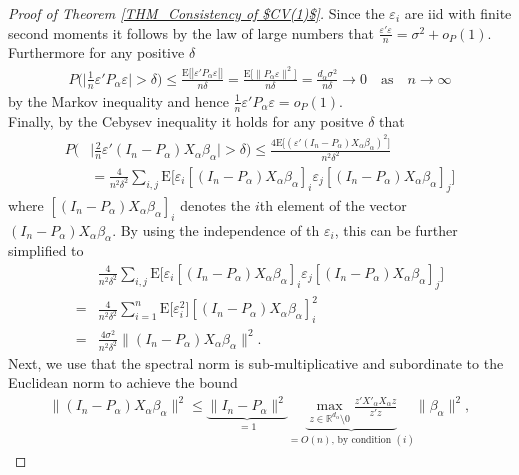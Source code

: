\documentclass[Research_Module_ES.tex]{subfiles}
\begin{document}
\begin{proof}[Proof of Theorem \ref{THM_Consistency of $CV(1)$}]
	Since the $\varepsilon_i$ are iid with finite second moments it follows by the law of large numbers that
	$\frac{\varepsilon'\varepsilon}{n} = \sigma^2 + o_P(1)$.
	Furthermore for any positive $\delta$
	\begin{align*}
	P\biggl(\biggl|\frac{1}{n}\varepsilon'P_\alpha\varepsilon\biggr|>\delta\biggr) \le \frac{\mathrm{E}\bigl[|\varepsilon'P_\alpha\varepsilon|\bigr]}{n\delta}=\frac{\mathrm{E}\bigl[\lVert P_\alpha\varepsilon\rVert^2\bigr]}{n\delta}=\frac{d_\alpha \sigma^2}{n\delta} \to 0 \quad \textrm{as} \quad n\to \infty
	\end{align*}
	by the Markov inequality and hence $\frac{1}{n}\varepsilon'P_\alpha\varepsilon = o_P(1)$.\\
	Finally, by the Cebysev inequality it holds for any positve $\delta$ that
	\begin{align*}
	P\biggl(&\biggl|\frac{2}{n}\varepsilon'(I_n-P_\alpha)X_\alpha\beta_\alpha\biggr|>\delta\biggr) \le \frac{4\mathrm{E}\bigl[(\varepsilon'(I_n-P_\alpha)X_\alpha\beta_\alpha)^2\bigr]}{n^2\delta^2}\\
	&=\frac{4}{n^2\delta^2}\sum_{i,j}\mathrm{E}\bigl[\varepsilon_i[(I_n-P_\alpha)X_\alpha\beta_\alpha]_i\varepsilon_j[(I_n-P_\alpha)X_\alpha\beta_\alpha]_j\bigr]
	\end{align*}
	where $[(I_n-P_\alpha)X_\alpha\beta_\alpha]_i$ denotes the $i$th element of the vector $(I_n-P_\alpha)X_\alpha\beta_\alpha$. By using the independence of th $\varepsilon_i$, this can be further simplified to
	\begin{align}
	&\frac{4}{n^2\delta^2}\sum_{i,j}\mathrm{E}\bigl[\varepsilon_i[(I_n-P_\alpha)X_\alpha\beta_\alpha]_i\varepsilon_j[(I_n-P_\alpha)X_\alpha\beta_\alpha]_j\bigr]\nonumber\\
	= &\frac{4}{n^2\delta^2}\sum_{i=1}^n\mathrm{E}\bigl[\varepsilon_i^2\bigr][(I_n-P_\alpha)X_\alpha\beta_\alpha]_i^2 \nonumber\\
	= &\frac{4\sigma^2}{n^2\delta^2}\lVert(I_n-P_\alpha)X_\alpha\beta_\alpha\rVert^2. \label{proof_CV_1}
	\end{align}
	Next, we use that the spectral norm is sub-multiplicative and subordinate to the Euclidean norm to achieve the bound
	\begin{align}
	\lVert(I_n-P_\alpha)X_\alpha\beta_\alpha\rVert^2
	\le \underbrace{\lVert I_n-P_\alpha \rVert^2}_{=1} \underbrace{\max_{z\in \mathbb{R}^{d_\alpha}\setminus 0}\frac{z'X'_\alpha X_\alpha z}{z'z}}_{=O(n)\textrm{, by condition $(i)$}} \lVert \beta_\alpha \rVert^2,\label{proof_CV_2}

\end{align}
\end{proof}
\end{document}
